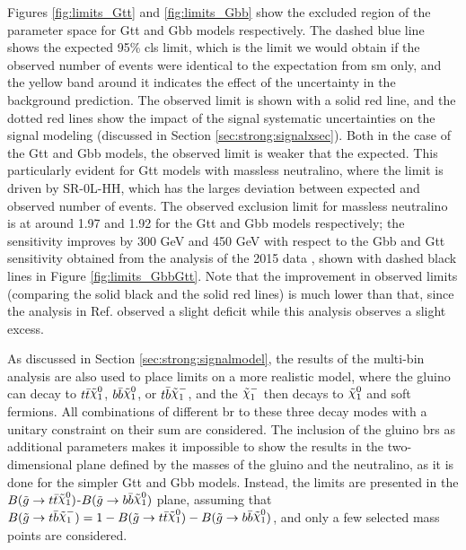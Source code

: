 Figures \ref{fig:limits_Gtt} and \ref{fig:limits_Gbb} show the excluded region of the parameter space for Gtt and Gbb models 
respectively. The dashed blue line shows the expected 95\% \gls{cls} limit, which is the limit we would obtain if the observed number of 
events were identical to the expectation from \gls{sm} only, and the yellow band around it indicates the effect of the 
uncertainty in the background prediction. The observed limit is shown with a solid red line, and the dotted red lines show the impact 
of the signal systematic uncertainties on the signal modeling (discussed in Section \ref{sec:strong:signalxsec}). 
Both in the case of the Gtt and Gbb models, the observed limit is weaker that the expected. 
This particularly evident for Gtt models with massless neutralino, where the limit is driven by SR-0L-HH, which has the larges deviation 
between expected and observed number of events.
The observed exclusion limit for massless neutralino is at around 1.97 and 1.92 for the Gtt and Gbb models respectively;
the sensitivity improves by 300 GeV and 450 GeV with respect to the Gbb and Gtt sensitivity obtained from the analysis of the 
2015 data \cite{Aad:2016eki}, shown with dashed black lines in Figure \ref{fig:limits_GbbGtt}. 
Note that the improvement in observed limits 
(comparing the solid black and the solid red lines) is much lower than that, since the analysis in Ref. \cite{Aad:2016eki}
observed a slight deficit while this analysis observes a slight excess. 

As discussed in Section \ref{sec:strong:signalmodel}, the results of the multi-bin analysis are also used to place 
limits on a more realistic model, where the gluino can decay to $ t \bar{t} \ninoone$, $ b \bar{b} \ninoone$, 
or $t \bar{b} \chinoonem$, and the $\chinoonem$ then decays to $\ninoone$ and soft fermions. All combinations of different \gls{br}
to these three decay modes with a unitary constraint on their sum are considered. 
The inclusion of the gluino \glspl{br} as additional parameters makes it impossible to show the results in the two-dimensional plane
defined by the masses of the gluino and the neutralino, as it is done for the simpler Gtt and Gbb models.
Instead, the limits are presented in the $B(\gluino \to t \bar{t} \ninoone)$-$B(\gluino \to b \bar{b} \ninoone)$ plane, 
assuming that $B(\gluino \to t \bar{b} \chinoonem) = 1 - B(\gluino \to t \bar{t} \ninoone) - B(\gluino \to b \bar{b} \ninoone)$, 
and only a few selected mass points are considered.  

